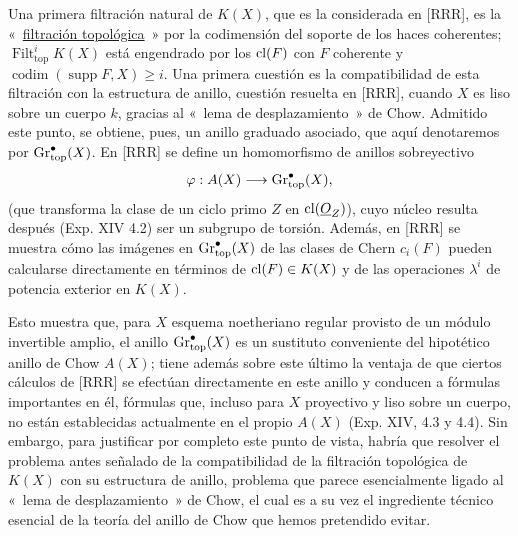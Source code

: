 Una primera filtración natural de $K(X)$, que es la considerada en [RRR], es
la «~\underline{filtración topológica}~» por la codimensión del soporte de
los haces coherentes; $\operatorname{Filt}^{i}_{\mathrm{top}}K(X)$ está
engendrado por los $\operatorname{cl}(F)$ con $F$ coherente y
$\operatorname{codim}(\operatorname{supp}F,X)\ge i$. Una primera cuestión es
la compatibilidad de esta filtración con la estructura de anillo, cuestión
resuelta en [RRR], cuando $X$ es liso sobre un cuerpo $k$, gracias al
«~lema de desplazamiento~» de Chow. Admitido este punto, se obtiene, pues, un
anillo graduado asociado, que aquí denotaremos por
$\operatorname{Gr}^{\bullet}_{\mathrm{top}}(X)$. En [RRR] se define un homomorfismo de
anillos sobreyectivo
\[
\varphi:A(X)\longrightarrow \operatorname{Gr}^{\bullet}_{\mathrm{top}}(X),
\]
(que transforma la clase de un ciclo primo $Z$ en
$\operatorname{cl}(\underline O_Z)$), cuyo núcleo resulta después (Exp. XIV 4.2) ser un
subgrupo de torsión. Además, en [RRR] se muestra cómo las imágenes en
$\operatorname{Gr}^{\bullet}_{\mathrm{top}}(X)$ de las clases de Chern $c_i(F)$ pueden
calcularse directamente en términos de $\operatorname{cl}(F)\in K(X)$ y de las
operaciones $\lambda^i$ de potencia exterior en $K(X)$.

Esto muestra que, para $X$ esquema noetheriano regular provisto de un módulo
invertible amplio, el anillo $\operatorname{Gr}^{\bullet}_{\mathrm{top}}(X)$ es un
sustituto conveniente del hipotético anillo de Chow $A(X)$; tiene además
sobre este último la ventaja de que ciertos cálculos de [RRR] se efectúan
directamente en este anillo y conducen a fórmulas importantes en él, fórmulas
que, incluso para $X$ proyectivo y liso sobre un cuerpo, no están
establecidas actualmente en el propio $A(X)$ (Exp. XIV, 4.3 y 4.4). Sin
embargo, para justificar por completo este punto de vista, habría que
resolver el problema antes señalado de la compatibilidad de la filtración
topológica de $K(X)$ con su estructura de anillo, problema que parece
esencialmente ligado al «~lema de desplazamiento~» de Chow, el cual es a su
vez el ingrediente técnico esencial de la teoría del anillo de Chow que
hemos pretendido evitar.

